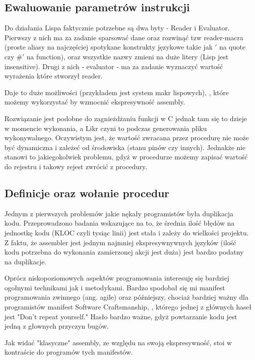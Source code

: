 \documentclass[11pt]{article}
\begin{document}
\subsection{Ewaluowanie parametrów instrukcji}

Do działania Lispa faktycznie potrzebne są dwa byty - Reader i Evaluator. Pierwszy z nich ma za zadanie sparsować dane oraz rozwinąć tzw reader-macra (proste aliasy na najczęściej spotykane konstrukty językowe takie jak $'$ na quote czy $\#'$ na function), oraz wszystkie nazwy zmieni na duże litery (Lisp jest insensitive). Drugi z nich - evaluator - ma za zadanie wyznaczyć wartość wyrażenia które stworzył reader. 

Daje to duże możliwości (przykładem jest system makr lispowych), , które możemy wykorzystać by wzmocnić ekspresywność assembly. 



Rozwiązanie jest podobne do zagnieżdżaniu funkcji w C jednak tam się to dzieje w momencie wykonania, a Likr czyni to podczas generowania pliku wykonywalnego.
Oczywistym jest, że wartość zwracana przez procedurę nie może być dynamiczna i zależeć od środowiska (stanu pinów czy innych).
Jednakże nie stanowi to jakiegokolwiek problemu, gdyż w procedurze możemy zapisać wartość do rejestru i takowy rejest zwrócić z procedury.

\subsection{Definicje oraz wołanie procedur}

Jednym z pierwszych problemów jakie nękały programistów była duplikacja kodu. Przeprowadzono badania wskazujące na to, że średnia ilość błędów na jednostkę kodu (KLOC czyli tysiąc linii) jest stała i zależy do wielkości projektu. Z faktu, że assembler jest jednym najmniej ekspresywnywnych języków (ilość kodu potrzebna do wykonania zamierzonej akcji jest duża) jest bardzo podatny na duplikacje.

Oprócz niskopoziomowych aspektów programowania interesuję się bardziej ogołnymi technikami jak i metodykami. Bardzo spodobał się mi manifest programowania zwinnego (ang. agile) oraz późniejszy, chociaż bardziej ważny dla programistów manifest Software Craftsmanship, , którego jednej z głównych haseł jest "Don't repeat yourself." Hasło bardzo ważne, gdyż powtarzanie kodu jest jedną z głownych przyczyn bugów. 

Jak widać "klasyczne" assembly, ze względu na swoją ekspresywność, stoi w kontraście do programów tych manifestów. 
\end{document}
